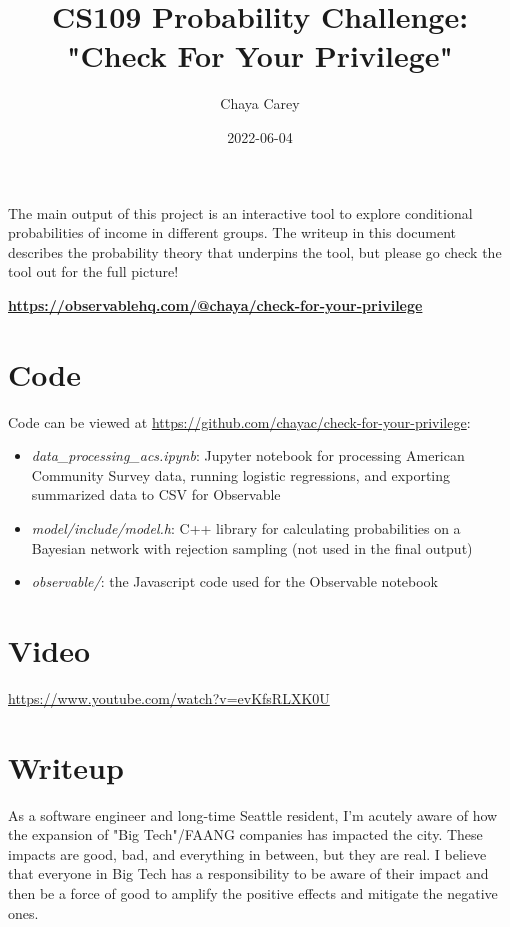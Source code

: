 \documentclass[11pt]{article}
\title{CS109 Probability Challenge: "Check For Your Privilege"}
\author{Chaya Carey}
\date{2022-06-04}
\begin{document}




The main output of this project is an interactive tool to explore conditional probabilities of income in different groups. The writeup in this document describes the probability theory that underpins the tool, but please go check the tool out for the full picture!

\textbf{\href{https://observablehq.com/@chaya/check-for-your-privilege}{https://observablehq.com/@chaya/check-for-your-privilege}}

\section{Code}
Code can be viewed at \href{https://github.com/chayac/check-for-your-privilege}{https://github.com/chayac/check-for-your-privilege}:
\begin{itemize}
    \item \textit{data\_processing\_acs.ipynb}: Jupyter notebook for processing American Community Survey data, running logistic regressions, and exporting summarized data to CSV for Observable
    \item \textit{model/include/model.h}: C++ library for calculating probabilities on a Bayesian network with rejection sampling (not used in the final output)
    \item \textit{observable/}: the Javascript code used for the Observable notebook
\end{itemize}

\section{Video}

\href{https://www.youtube.com/watch?v=evKfsRLXK0U}{https://www.youtube.com/watch?v=evKfsRLXK0U}
\newpage

\section{Writeup}

As a software engineer and long-time Seattle resident, I'm acutely aware of how the expansion of "Big Tech"/FAANG companies has impacted the city. These impacts are good, bad, and everything in between, but they are real. I believe that everyone in Big Tech has a responsibility to be aware of their impact and then be a force of good to amplify the positive effects and mitigate the negative ones.
\end{document}
